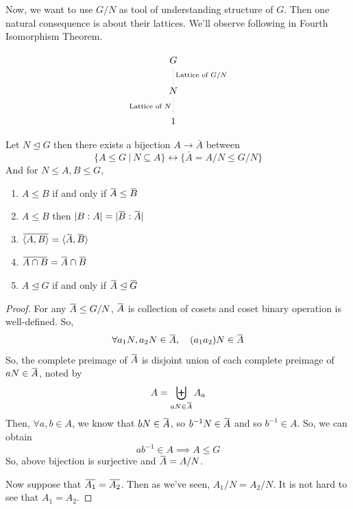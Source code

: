\documentclass[12pt, a4paper, openany, twoside]{book}
\newcommand{\overbar}[1]{\mkern 1.5mu\overline{\mkern-1.5mu#1\mkern-1.5mu}\mkern 1.5mu}
\theoremstyle{definition}
\theoremstyle{remark}
\theoremstyle{plain}
\numberwithin{equation}{section}
\begin{document}
Now, we want to use $G/N$ as tool of understanding structure of $G$. Then one natural consequence is about their lattices. 
We'll observe following in Fourth Isomorphism Theorem.

\[
\begin{tikzcd}
    G \arrow[d, no head, dotted, "\text{Lattice of }G/N"] \\
    N \arrow[d, no head, dotted, "\text{Lattice of }N"']\\
    1
\end{tikzcd}
\]

\begin{tcolorbox}[colback=yellow!10!white,colframe=blue!75!black,title=Fourth Isomorphism Theorem]

Let $N \trianglelefteq G$ then there exists a bijection $A \rightarrow \bar{A}$ between 
\[\{A \leq G ~|~ N \subseteq A\} \leftrightarrow \{\bar{A} = A/N \leq G/N\}\]
And for $N \leq A, B \leq G$, 
\begin{enumerate}
    \item $A \leq B$ if and only if $\overbar{A} \leq \overbar{B}$
    \item $A \leq B$ then $|B : A| = |\overbar{B} : \overbar{A}|$
    \item $\overbar{\langle A, B \rangle} = \langle \overbar{A}, \overbar{B} \rangle$
    \item $\overbar{A \cap B} = \overbar{A} \cap \overbar{B}$
    \item $A \trianglelefteq G$ if and only if $\overbar{A} \trianglelefteq \overbar{G}$
\end{enumerate}
\end{tcolorbox}

\begin{proof}
    
For any $\overbar{A} \leq G/N$, $\overbar{A}$ is collection of cosets and coset binary operation is well-defined. 
So, 
\[\forall a_1N , a_2N \in \overbar{A}, \quad (a_1a_2)N \in \overbar{A}\] 
So, the complete preimage of $\overbar{A}$ is disjoint union of each complete preimage of $aN \in \overbar{A}$, 
noted by 
\[A = \biguplus_{aN \in \overbar{A}} A_a\]
Then, $\forall a, b \in A$, we know that $bN \in \overbar{A}$, so $b^{-1}N \in \overbar{A}$ and so $b^{-1} \in A$. 
So, we can obtain 
\[ab^{-1} \in A \implies A \leq G\]
So, above bijection is surjective and $\overbar{A} = A/N$. 

Now suppose that $\overbar{A_1} = \overbar{A_2}$. Then as we've seen, $A_1/N = A_2/N$. 
It is not hard to see that $A_1 = A_2$. 

\end{proof}
\end{document}
